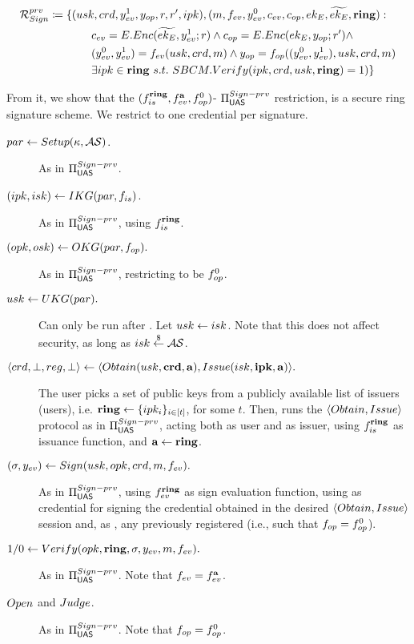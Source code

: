 \begin{align}
  & \mathcal{R}_{Sign}^{prv} \coloneqq \lbrace (usk,crd,y_{ev}^1,y_{op},r,r',
    ipk),(m,f_{ev},y_{ev}^0,c_{ev},c_{op},ek_{E},\widetilde{ek_{E}},\mathbf{ring}): \nonumber \\
  & \hspace*{6.405em}c_{ev} = E.Enc(\widetilde{ek_{E}},y_{ev}^1;r) \land
    c_{op} = E.Enc(ek_{E},y_{op};r') \land \nonumber \\
  & \hspace*{6.40em}(y_{ev}^0,y_{ev}^1) = f_{ev}(usk,crd,m) \land
    y_{op} = f_{op}((y_{ev}^0,y_{ev}^1),usk,crd,m) \nonumber \\
  & \hspace*{6.40em}\exists ipk \in \mathbf{ring}~s.t.~SBCM.Verify(ipk,crd,usk,
    \mathbf{ring}) = 1) \rbrace \label{eq:sign-prv}
\end{align}

From it, we show that the $(f_{is}^{\mathbf{ring}},f_{ev}^{\mathbf{a}},f_{op}^0)$-
$\Pi_{\mathsf{UAS}}^{Sign-prv}$ restriction, is a secure ring signature scheme. We
restrict to one credential per signature.

\begin{description}  
\item[$par \gets Setup(\kappa,\mathcal{AS})$.] As in $\Pi_{\mathsf{UAS}}^{Sign-prv}$.  
\item[$(ipk,isk) \gets IKG(par,f_{is})$.] As in
  $\Pi_{\mathsf{UAS}}^{Sign-prv}$, using $f_{is}^{\mathbf{ring}}$.  
\item[$(opk,osk) \gets OKG(par,f_{op}).$] As in $\Pi_{\mathsf{UAS}}^{Sign-prv}$,
  restricting \finsp to be $f_{op}^0$.  
\item[$usk \gets UKG(par).$] Can only be run after \IKeyGen. Let 
  $usk \gets isk$. Note that this does not affect security, as long as
  $isk \stackrel{\$}{\gets} \mathcal{AS}$.
\item[$\langle crd,\bot,reg,\bot \rangle \gets
  \langle Obtain(usk,\mathbf{crd},\mathbf{a}),Issue(isk,\mathbf{ipk},\mathbf{a})\rangle.$]
  The user picks a set of public keys from a publicly available list of issuers
  (users), i.e. $\mathbf{ring} \gets \lbrace ipk_i \rbrace_{i \in [t]}$, for some $t$.
  Then, runs the $\langle Obtain,Issue \rangle$ protocol as in
  $\Pi_{\mathsf{UAS}}^{Sign-prv}$, acting both as user and as issuer, using
  $f_{is}^{\mathbf{ring}}$ as issuance function, and $\mathbf{a} \gets \mathbf{ring}$.
\item[$(\sigma,y_{ev}) \gets Sign(usk,opk,crd,m,f_{ev}).$] As in
  $\Pi_{\mathsf{UAS}}^{Sign-prv}$, using $f_{ev}^{\mathbf{ring}}$ as sign evaluation function,
  using as credential for signing the credential obtained in the desired
  $\langle Obtain,Issue \rangle$ session and, as \opk, any previously
  registered \opk (i.e., such that $f_{op}=f_{op}^0$).
\item[$1/0 \gets Verify(opk,\mathbf{ring},\sigma,y_{ev},m,f_{ev}).$] As in
  $\Pi_{\mathsf{UAS}}^{Sign-prv}$. Note that $f_{ev}=f_{ev}^{\mathbf{a}}$.
\item[$Open$ and $Judge$.] As in $\Pi_{\mathsf{UAS}}^{Sign-prv}$. Note that
  $f_{op}=f_{op}^0$.
\end{description}

